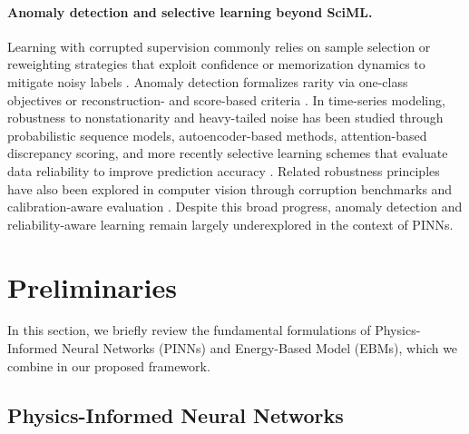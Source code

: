 \documentclass{article}
\theoremstyle{plain}
\theoremstyle{definition}
\theoremstyle{remark}
\begin{document}
\paragraph{Anomaly detection and selective learning beyond SciML.} Learning with corrupted supervision commonly relies on sample selection or reweighting strategies that exploit confidence or memorization dynamics to mitigate noisy labels \cite{Jiang2018, Han2018, Li2020, Natarajan2013}. Anomaly detection formalizes rarity via one-class objectives or reconstruction- and score-based criteria \cite{Chandola2013, Ruff2018, Pang2021}. In time-series modeling, robustness to nonstationarity and heavy-tailed noise has been studied through probabilistic sequence models, autoencoder-based methods, attention-based discrepancy scoring, and more recently selective learning schemes that evaluate data reliability to improve prediction accuracy \cite{Su2019, Audibert2020, Xu2021, Tuli2022, Fu2025, Wu2025}. Related robustness principles have also been explored in computer vision through corruption benchmarks and calibration-aware evaluation \cite{Hendrycks2019, Mao2022, Ovadia2019}. Despite this broad progress, anomaly detection and reliability-aware learning remain largely underexplored in the context of PINNs.


\section{Preliminaries}
\label{sec:preliminaries}

In this section, we briefly review the fundamental formulations of Physics-Informed Neural Networks (PINNs) and Energy-Based Model (EBMs), which we combine in our proposed framework.

\subsection{Physics-Informed Neural Networks}
\end{document}
